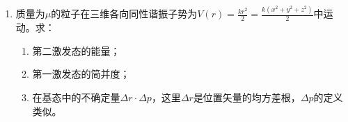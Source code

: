 \begin{enumerate}
{\begin{enumerate}
		\item 由归一化条件 $\langle\psi|\psi\rangle=1$，
		\[
			\rho|\psi\rangle=|\psi\rangle,
		\]
		故沿 $|\psi\rangle$ 的本征值为 $1$。任意与 $|\psi\rangle$ 正交的态 $|u_\perp\rangle$ 满足 $\rho|u_\perp\rangle=0$，故其余本征值全为 $0$。

		\item 由薛定谔方程及其伴随式，
		\begin{align*}
			i\hbar\frac{\partial\rho}{\partial t}
			&=i\hbar\left(|\dot\psi\rangle\langle\psi|+|\psi\rangle\langle\dot\psi|\right)\\
			&=H|\psi\rangle\langle\psi|-|\psi\rangle\langle\psi|H
			=[H,\rho].
		\end{align*}
		这就是纯态密度算符的 von Neumann 方程。
	\end{enumerate}
}


\newpage
\item 
质量为$\mu$的粒子在三维各向同性谐振子势为$V(r)=\frac{kr^2}{2}=\frac{k(x^2+y^2+z^2)}{2}$中运动。求：
\begin{enumerate}
	\item
第二激发态的能量；
\item 
第一激发态的简并度；
\item 
在基态中的不确定量$\Delta r\cdot\Delta p$，这里$\Delta r$是位置矢量的均方差根，$\Delta p$的定义类似。
\end{enumerate}





\end{enumerate}
